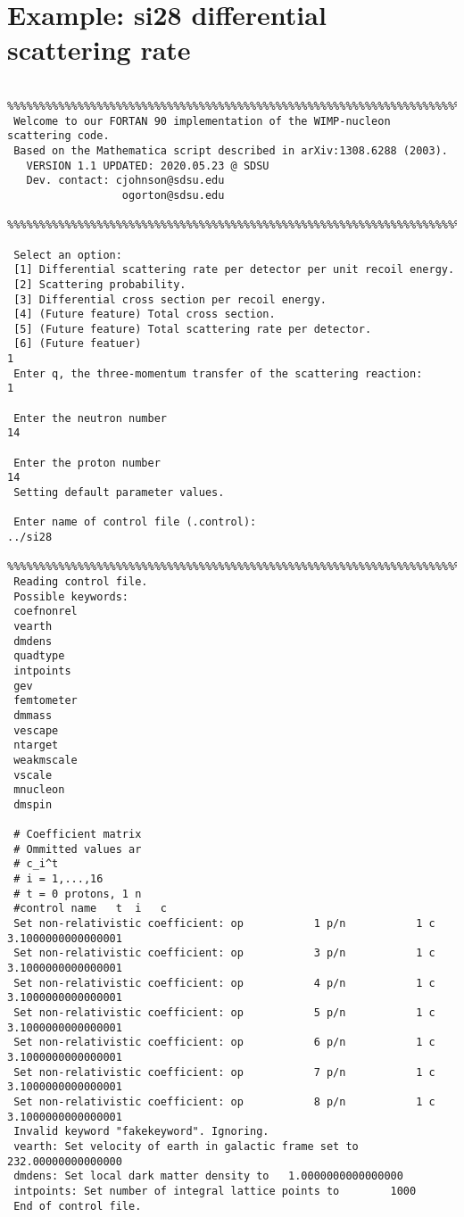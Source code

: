 \documentclass[11pt]{amsart}
\begin{document}
\section{Example: si28 differential scattering rate}
\small
\begin{verbatim}
 %%%%%%%%%%%%%%%%%%%%%%%%%%%%%%%%%%%%%%%%%%%%%%%%%%%%%%%%%%%%%%%%%%%%%%%%%%%%%%%
 Welcome to our FORTAN 90 implementation of the WIMP-nucleon scattering code.
 Based on the Mathematica script described in arXiv:1308.6288 (2003).
   VERSION 1.1 UPDATED: 2020.05.23 @ SDSU
   Dev. contact: cjohnson@sdsu.edu
                  ogorton@sdsu.edu
 %%%%%%%%%%%%%%%%%%%%%%%%%%%%%%%%%%%%%%%%%%%%%%%%%%%%%%%%%%%%%%%%%%%%%%%%%%%%%%%
 
 Select an option:
 [1] Differential scattering rate per detector per unit recoil energy.
 [2] Scattering probability.
 [3] Differential cross section per recoil energy.
 [4] (Future feature) Total cross section.
 [5] (Future feature) Total scattering rate per detector.
 [6] (Future featuer) 
1
 Enter q, the three-momentum transfer of the scattering reaction:
1
  
 Enter the neutron number 
14
  
 Enter the proton number 
14
 Setting default parameter values.
  
 Enter name of control file (.control):
../si28
 %%%%%%%%%%%%%%%%%%%%%%%%%%%%%%%%%%%%%%%%%%%%%%%%%%%%%%%%%%%%%%%%%%%%%%%%%%%%%%%
 Reading control file.
 Possible keywords:
 coefnonrel          
 vearth              
 dmdens              
 quadtype            
 intpoints           
 gev                 
 femtometer          
 dmmass              
 vescape             
 ntarget             
 weakmscale          
 vscale              
 mnucleon            
 dmspin              
 
 # Coefficient matrix
 # Ommitted values ar
 # c_i^t             
 # i = 1,...,16      
 # t = 0 protons, 1 n
 #control name	 t	i	c
 Set non-relativistic coefficient: op           1 p/n           1 c   3.1000000000000001     
 Set non-relativistic coefficient: op           3 p/n           1 c   3.1000000000000001     
 Set non-relativistic coefficient: op           4 p/n           1 c   3.1000000000000001     
 Set non-relativistic coefficient: op           5 p/n           1 c   3.1000000000000001     
 Set non-relativistic coefficient: op           6 p/n           1 c   3.1000000000000001     
 Set non-relativistic coefficient: op           7 p/n           1 c   3.1000000000000001     
 Set non-relativistic coefficient: op           8 p/n           1 c   3.1000000000000001     
 Invalid keyword "fakekeyword". Ignoring.
 vearth: Set velocity of earth in galactic frame set to   232.00000000000000     
 dmdens: Set local dark matter density to   1.0000000000000000     
 intpoints: Set number of integral lattice points to        1000
 End of control file.
 

\end{verbatim}
\end{document}
